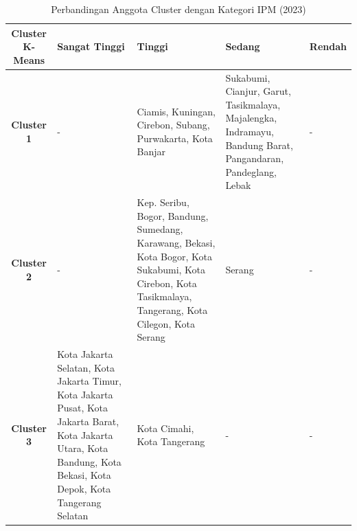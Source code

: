 \begin{table}[H]
\centering
\caption{Perbandingan Anggota Cluster dengan Kategori IPM (2023)} \label{tab:ipm_cross_2023}
\begin{tabular}{|c|p{2cm}|p{2cm}|p{2cm}|p{2cm}|}
\hline
\textbf{Cluster K-Means} & \textbf{Sangat Tinggi} & \textbf{Tinggi} & \textbf{Sedang} & \textbf{Rendah} \\ \hline
\textbf{Cluster 1} & - & Ciamis, Kuningan, Cirebon, Subang, Purwakarta, Kota Banjar & Sukabumi, Cianjur, Garut, Tasikmalaya, Majalengka, Indramayu, Bandung Barat, Pangandaran, Pandeglang, Lebak & - \\ \hline
\textbf{Cluster 2} & - & Kep. Seribu, Bogor, Bandung, Sumedang, Karawang, Bekasi, Kota Bogor, Kota Sukabumi, Kota Cirebon, Kota Tasikmalaya, Tangerang, Kota Cilegon, Kota Serang & Serang & - \\ \hline
\textbf{Cluster 3} & Kota Jakarta Selatan, Kota Jakarta Timur, Kota Jakarta Pusat, Kota Jakarta Barat, Kota Jakarta Utara, Kota Bandung, Kota Bekasi, Kota Depok, Kota Tangerang Selatan & Kota Cimahi, Kota Tangerang & - & - \\ \hline
\end{tabular}
\end{table}